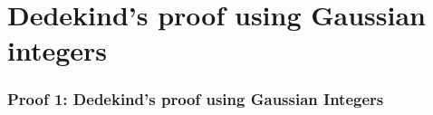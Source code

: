 \documentclass{beamer}
\begin{document}
%

\section{Dedekind's proof using Gaussian integers}

\begin{frame}
	\frametitle{Proof 1: Dedekind's proof using Gaussian Integers}
\end{frame}
\end{document}

